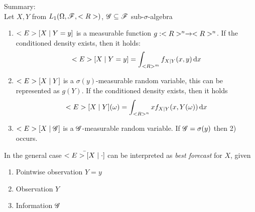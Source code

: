 Summary:\\
Let $X,Y$ from $L_1(\Omega,\mathscr F,<R>)$, $\mathscr{G} \subseteq \mathscr F$ sub-$\sigma$-algebra
\begin{enumerate}
	\item $<E>[X\mid Y=y]$ is a measurable function $g: <R>^n \to <R>^n$. If the conditioned density exists, then it holds:
	\begin{align*}
		<E>[X\mid Y=y] = \int_{<R>^m} f_{X\mid Y} (x,y) \,\mathrm{d} x
	\end{align*}
	\item $<E>[X\mid Y]$ is a $\sigma(y)$-measurable random variable, this can be represented as $g(Y)$. If the conditioned density exists, then it holds
	\begin{align*}
		<E>[X\mid Y](\omega) = \int_{<R>^n}xf_{X\mid Y}(x,Y(\omega))\,\mathrm{d} x
	\end{align*}
	\item $<E>[X \mid \mathscr{G}]$ is a $\mathscr{G}$-measurable random variable. If $\mathscr{G} = \sigma(y)$ then 2) occurs.
\end{enumerate}
In the general case $\bar{<E>[X\mid \cdot]}$ can be interpreted as \emph{best forecast} for $X$, given
\begin{enumerate}
	\item Pointwise observation $Y=y$
	\item Observation $Y$
	\item Information $\mathscr{G}$
\end{enumerate}
